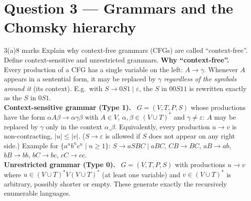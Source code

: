 \documentclass[10.5pt,a4paper]{article}
\newcommand{\ansh}[1]{\textbf{\color{exborder}#1}\ }
\newcommand{\eps}{\varepsilon}
\begin{document}
\section{Question 3 --- Grammars and the Chomsky hierarchy}
\begin{qa}{3(a)}{8 marks}
Explain why context-free grammars (CFGs) are called ``context-free''. Define context-sensitive and unrestricted grammars.
\tcblower
\ansh{Why ``context-free''.} Every production of a CFG has a single variable on the left: $A\to\gamma$. Whenever $A$ appears in a sentential
form, it may be replaced by $\gamma$ \emph{regardless of the symbols around it} (its context). E.g.\ with $S\to0S1\mid\eps$, the $S$ in $00S11$
is rewritten exactly as the $S$ in $0S1$.\\
\ansh{Context-sensitive grammar (Type 1).} $G=(V,T,P,S)$ whose productions have the form $\alpha A\beta\to\alpha\gamma\beta$ with
$A\in V$, $\alpha,\beta\in(V\cup T)^*$ and $\gamma\ne\eps$: $A$ may be replaced by $\gamma$ only in the context $\alpha\_\beta$. Equivalently,
every production $u\to v$ is non-contracting, $|u|\le|v|$. ($S\to\eps$ is allowed if $S$ does not appear on any right side.)
Example for $\{a^nb^nc^n\mid n\ge1\}$: $S\to aSBC\mid aBC$, $CB\to BC$, $aB\to ab$, $bB\to bb$, $bC\to bc$, $cC\to cc$.\\
\ansh{Unrestricted grammar (Type 0).} $G=(V,T,P,S)$ with productions $u\to v$ where $u\in(V\cup T)^*V(V\cup T)^*$ (at least one variable)
and $v\in(V\cup T)^*$ is arbitrary, possibly shorter or empty. These generate exactly the recursively enumerable languages.
\end{qa}
\end{document}

